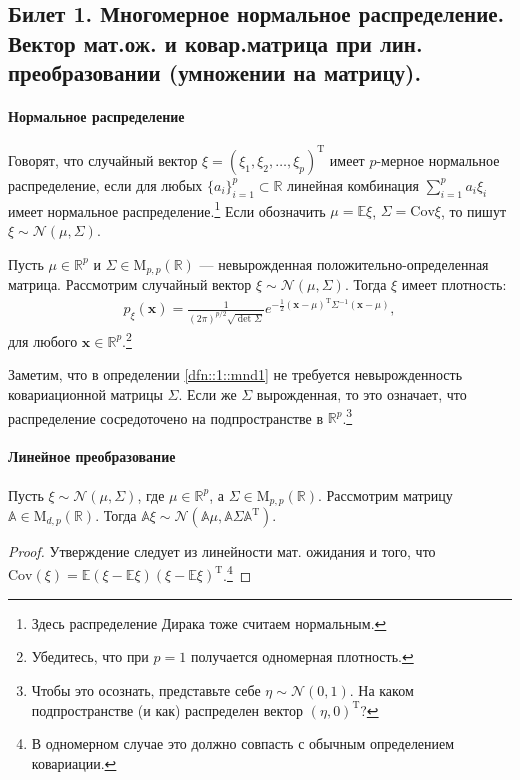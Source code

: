 \subsection{Билет 1. Многомерное нормальное распределение. Вектор мат.ож. и ковар.матрица при лин. преобразовании (умножении на матрицу).}
\paragraph{Нормальное распределение}
\begin{dfn}
    \label{dfn::1::mnd1}
    Говорят, что случайный вектор $\mathbb \xi = (\xi_1, \xi_2, \ldots, \xi_p)^\mathrm T$ имеет $p$-мерное нормальное распределение, если %
    для любых $\{a_i\}_{i=1}^p \subset \mathbb R$ линейная комбинация $\sum_{i=1}^p a_i \xi_i$ имеет 
    нормальное распределение.\footnote{Здесь распределение Дирака тоже считаем нормальным.}
    Если обозначить $\mu = \mathbb E \xi$, $\Sigma = \mathrm{Cov} \xi$, то пишут $\xi \sim \mathcal N(\mu, \Sigma)$.
\end{dfn}
\begin{thm}
    \label{thm::1::mnd2}
    Пусть $\mu \in \mathbb R^p$ и $\Sigma \in \mathrm M_{p, p}(\mathbb R)$ --- невырожденная положительно-определенная матрица.
    Рассмотрим случайный вектор $\mathbb \xi \sim \mathcal N(\mu, \Sigma)$.
    Тогда $\mathbb \xi$ имеет плотность:
    \begin{gather}
        \label{mnd_dens}
        p_\mathbb \xi (\mathbf x) = \frac{1}{(2 \pi)^{p/2} \sqrt{\det \Sigma}}
        e^{-\frac{1}{2} (\mathbf{x} - \mu)^\mathrm T \Sigma^{-1} (\mathbf x - \mu)},
    \end{gather}
    для любого $\mathbf x \in \mathbb R^p$.\footnote{Убедитесь, что при $p = 1$ получается одномерная плотность.}
\end{thm}

Заметим, что в определении \ref{dfn::1::mnd1} не требуется невырожденность ковариационной матрицы $\Sigma$.
Если же $\Sigma$ вырожденная, то это означает, что распределение сосредоточено на подпространстве в $\mathbb R^p$.\footnote{Чтобы
    это осознать, представьте себе $\eta \sim \mathcal N(0, 1)$. На каком подпространстве (и как) распределен вектор $(\eta, 0)^\mathrm T$?
}
\paragraph{Линейное преобразование}
\begin{thm}
Пусть $\xi \sim \mathcal N(\mu, \Sigma)$, где $\mu \in \mathbb R^p$, а $\Sigma \in \mathrm M_{p,p}(\mathbb R)$. Рассмотрим матрицу $\mathbb A \in \mathrm M_{d,p}(\mathbb R)$.
    Тогда $\mathbb A \xi \sim \mathcal N\left(\mathbb A \mu, \mathbb A \Sigma \mathbb A^\mathrm T\right)$.  \end{thm}
\begin{proof}
    Утверждение следует из линейности мат. ожидания и того, что $\mathrm{Cov}(\xi) = \mathbb E(\xi-\mathbb E\xi)(\xi-\mathbb E\xi)^\mathrm T$.\footnote{В
    одномерном случае это должно совпасть с обычным определением ковариации.}
\end{proof}


